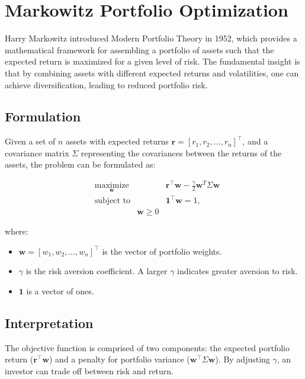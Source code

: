 


\section{Markowitz Portfolio Optimization}

Harry Markowitz introduced Modern Portfolio Theory in 1952, which provides a mathematical framework for assembling a portfolio of assets such that the expected return is maximized for a given level of risk. The fundamental insight is that by combining assets with different expected returns and volatilities, one can achieve diversification, leading to reduced portfolio risk.

\subsection{Formulation}

Given a set of $n$ assets with expected returns $\mathbf{r} = [r_1, r_2, \ldots, r_n]^\top$, and a covariance matrix $\Sigma$ representing the covariances between the returns of the assets, the problem can be formulated as:

\begin{equation}
\begin{aligned}
& \underset{\mathbf{w}}{\text{maximize}}
& & \mathbf{r}^\top\mathbf{w} - \frac{\gamma}{2} \mathbf{w}^T \Sigma \mathbf{w} \\
& \text{subject to}
& & \mathbf{1}^\top\mathbf{w} = 1, \\
& & \mathbf{w} \geq 0
\end{aligned}
\end{equation}

where:
\begin{itemize}
    \item $\mathbf{w} = [w_1, w_2, \ldots, w_n]^\top$ is the vector of portfolio weights.
    \item $\gamma$ is the risk aversion coefficient. A larger $\gamma$ indicates greater aversion to risk.
    \item $\mathbf{1}$ is a vector of ones.
\end{itemize}

\subsection{Interpretation}

The objective function is comprised of two components: the expected portfolio return ($\mathbf{r}^\top\mathbf{w}$) and a penalty for portfolio variance ($\mathbf{w}^\top \Sigma \mathbf{w}$). By adjusting $\gamma$, an investor can trade off between risk and return.

